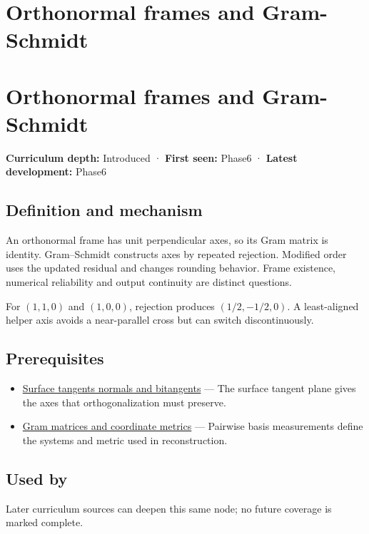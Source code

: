 \hypertarget{appendix-c39f1ed34271}{}
\section*{Orthonormal frames and Gram-Schmidt}
\section{Orthonormal frames and Gram-Schmidt}\label{orthonormal-frames-and-gram-schmidt}

\textbf{Curriculum depth:} Introduced · \textbf{First seen:} Phase6 · \textbf{Latest development:} Phase6

\subsection{Definition and mechanism}\label{definition-and-mechanism}

An orthonormal frame has unit perpendicular axes, so its Gram matrix is identity. Gram--Schmidt constructs axes by repeated rejection. Modified order uses the updated residual and changes rounding behavior. Frame existence, numerical reliability and output continuity are distinct questions.

For \((1,1,0)\) and \((1,0,0)\), rejection produces \((1/2,-1/2,0)\). A least-aligned helper axis avoids a near-parallel cross but can switch discontinuously.

\subsection{Prerequisites}\label{prerequisites}

\begin{itemize}
\tightlist
\item
  \hyperref[appendix-e31893dec985]{Surface tangents normals and bitangents} --- The surface tangent plane gives the axes that orthogonalization must preserve.
\item
  \hyperref[appendix-3b863809f82a]{Gram matrices and coordinate metrics} --- Pairwise basis measurements define the systems and metric used in reconstruction.
\end{itemize}

\subsection{Used by}\label{used-by}

Later curriculum sources can deepen this same node; no future coverage is marked complete.

